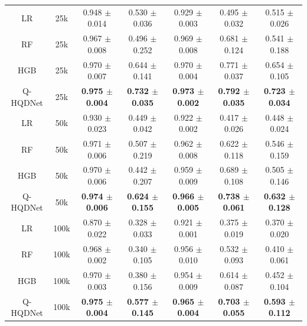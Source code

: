 \begin{table}[!t]
{\begin{tabular}{c c c c c c c}
\hline
LR & 25k & 0.948 $\pm$ 0.014 & 0.530 $\pm$ 0.036 & 0.929 $\pm$ 0.003 & 0.495 $\pm$ 0.032 & 0.515 $\pm$ 0.026 \\
RF & 25k & 0.967 $\pm$ 0.008 & 0.496 $\pm$ 0.252 & 0.969 $\pm$ 0.008 & 0.681 $\pm$ 0.124 & 0.541 $\pm$ 0.188 \\
HGB & 25k & 0.970 $\pm$ 0.007 & 0.644 $\pm$ 0.141 & 0.970 $\pm$ 0.004 & 0.771 $\pm$ 0.037 & 0.654 $\pm$ 0.105 \\
Q-HQDNet & 25k & \textbf{0.975 $\pm$ 0.004} & \textbf{0.732 $\pm$ 0.035} & \textbf{0.973 $\pm$ 0.002} & \textbf{0.792 $\pm$ 0.035} & \textbf{0.723 $\pm$ 0.034} \\
\hline
LR & 50k & 0.930 $\pm$ 0.023 & 0.449 $\pm$ 0.042 & 0.922 $\pm$ 0.002 & 0.417 $\pm$ 0.026 & 0.448 $\pm$ 0.024 \\
RF & 50k & 0.971 $\pm$ 0.006 & 0.507 $\pm$ 0.219 & 0.962 $\pm$ 0.008 & 0.622 $\pm$ 0.118 & 0.546 $\pm$ 0.159 \\
HGB & 50k & 0.970 $\pm$ 0.006 & 0.442 $\pm$ 0.207 & 0.959 $\pm$ 0.009 & 0.689 $\pm$ 0.108 & 0.505 $\pm$ 0.146 \\
Q-HQDNet & 50k & \textbf{0.974 $\pm$ 0.006} & \textbf{0.624 $\pm$ 0.155} & \textbf{0.966 $\pm$ 0.005} & \textbf{0.738 $\pm$ 0.061} & \textbf{0.632 $\pm$ 0.128} \\
\hline
LR & 100k & 0.870 $\pm$ 0.022 & 0.328 $\pm$ 0.033 & 0.921 $\pm$ 0.001 & 0.375 $\pm$ 0.019 & 0.370 $\pm$ 0.020 \\
RF & 100k & 0.968 $\pm$ 0.002 & 0.340 $\pm$ 0.105 & 0.956 $\pm$ 0.010 & 0.532 $\pm$ 0.093 & 0.410 $\pm$ 0.061 \\
HGB & 100k & 0.970 $\pm$ 0.003 & 0.380 $\pm$ 0.156 & 0.954 $\pm$ 0.009 & 0.614 $\pm$ 0.087 & 0.452 $\pm$ 0.104 \\
Q-HQDNet & 100k & \textbf{0.975 $\pm$ 0.004} & \textbf{0.577 $\pm$ 0.145} & \textbf{0.965 $\pm$ 0.004} & \textbf{0.703 $\pm$ 0.055} & \textbf{0.593 $\pm$ 0.112} \\
\hline
\end{tabular}
}
\vspace{-3mm}
\end{table}
